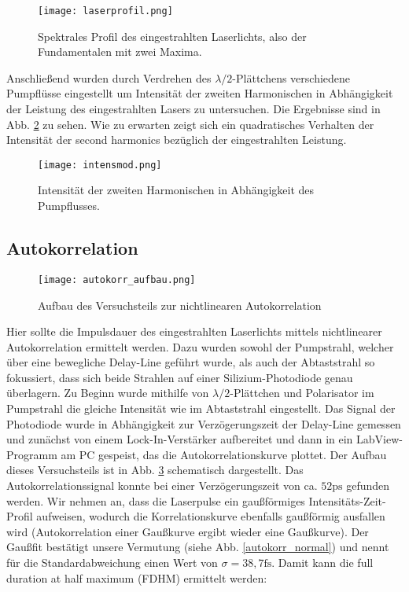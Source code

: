 \documentclass[a4paper,12pt]{scrartcl}
\begin{document}
\begin{figure}[H]
	\begin{center}
		\texttt{[image: laserprofil.png]}
		\caption{Spektrales Profil des eingestrahlten Laserlichts, also der Fundamentalen mit zwei Maxima.}
		\label{laserprofil}
	\end{center}
\end{figure}

Anschließend wurden durch Verdrehen des $\lambda/2$-Plättchens verschiedene Pumpflüsse eingestellt um Intensität der zweiten Harmonischen in Abhängigkeit der Leistung des eingestrahlten Lasers zu untersuchen. Die Ergebnisse sind in Abb. \ref{intensitätmod} zu sehen. Wie zu erwarten zeigt sich ein quadratisches Verhalten der Intensität der second harmonics bezüglich der eingestrahlten Leistung.

\begin{figure}[H]
	\begin{center}
		\texttt{[image: intensmod.png]}
		\caption{Intensität der zweiten Harmonischen in Abhängigkeit des Pumpflusses.}
		\label{intensitätmod}
	\end{center}
\end{figure}


\subsection{Autokorrelation}
\begin{figure}[H]
	\begin{center}
		\texttt{[image: autokorr\_aufbau.png]}
		\caption{Aufbau des Versuchsteils zur nichtlinearen Autokorrelation}
		\label{autokorr_aufbau}
	\end{center}
\end{figure}

Hier sollte die Impulsdauer des eingestrahlten Laserlichts mittels nichtlinearer Autokorrelation ermittelt werden. Dazu wurden sowohl der Pumpstrahl, welcher über eine bewegliche Delay-Line geführt wurde, als auch der Abtaststrahl so fokussiert, dass sich beide Strahlen auf einer Silizium-Photodiode genau überlagern. Zu Beginn wurde mithilfe von $\lambda/2$-Plättchen und Polarisator im Pumpstrahl die gleiche Intensität wie im Abtaststrahl eingestellt. Das Signal der Photodiode wurde in Abhängigkeit zur Verzögerungszeit der Delay-Line gemessen und zunächst von einem Lock-In-Verstärker aufbereitet und dann in ein LabView-Programm am PC gespeist, das die Autokorrelationskurve plottet. Der Aufbau dieses Versuchsteils ist in Abb. \ref{autokorr_aufbau} schematisch dargestellt.
Das Autokorrelationssignal konnte bei einer Verzögerungszeit von ca. $52 \si{\pico\second}$ gefunden werden. Wir nehmen an, dass die Laserpulse ein gaußförmiges Intensitäts-Zeit-Profil aufweisen, wodurch die Korrelationskurve ebenfalls gaußförmig ausfallen wird (Autokorrelation einer Gaußkurve ergibt wieder eine Gaußkurve). Der Gaußfit bestätigt unsere Vermutung (siehe Abb. \ref{autokorr_normal}) und nennt für die Standardabweichung einen Wert von $\sigma=38,7\si{\femto\second}$. Damit kann die full duration at half maximum (FDHM) ermittelt werden:
\end{document}
